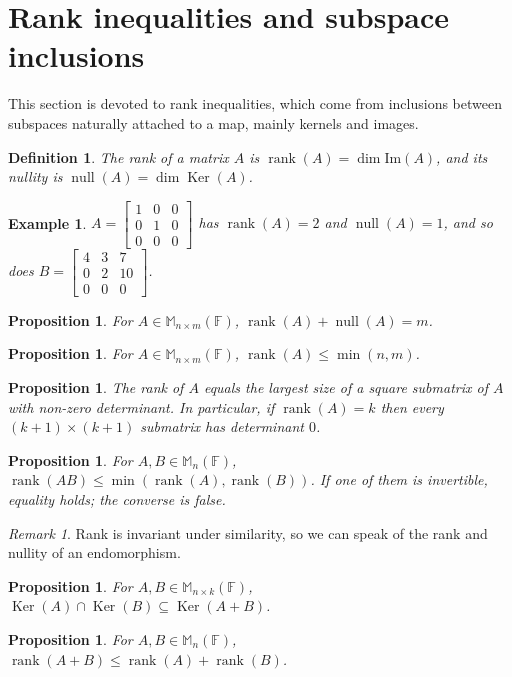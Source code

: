 \documentclass[12pt]{article}
\DeclareMathOperator{\Rank}{rank}
\DeclareMathOperator{\Null}{null}
\DeclareMathOperator{\Ker}{Ker}
\theoremstyle{breakplain}
\newtheorem{prop}[theorem]{Proposition}
\theoremstyle{breakdef}
\newtheorem{definition}[theorem]{Definition}
\newtheorem*{example}{Example}
\theoremstyle{remark}
\newtheorem*{remark}{Remark}
\begin{document}
\newpage
\section{Rank inequalities and subspace inclusions}
This section is devoted to rank inequalities, which come from inclusions between subspaces naturally attached to a map, mainly kernels and images.
\begin{definition}
    The \emph{rank} of a matrix $A$ is $\Rank(A)=\dim\mathrm{Im}(A)$, and its \emph{nullity} is $\Null(A)=\dim\Ker(A)$.
\end{definition}
\begin{example}
    $A=\begin{bmatrix}
        1 & 0 & 0\\0 & 1 & 0\\ 0& 0 & 0
    \end{bmatrix}$ has $\Rank(A)=2$ and $\Null(A)=1$, and so does $B=\begin{bmatrix}
        4 & 3 & 7\\0 & 2 & 10\\ 0& 0 & 0
    \end{bmatrix}$.
\end{example}
\begin{prop}
    For $A\in \mathbb{M}_{n\times m}(\mathbb{F})$, $\Rank(A)+\Null(A)=m$.
\end{prop}
\begin{prop}
    For $A\in \mathbb{M}_{n\times m}(\mathbb{F})$, $\Rank(A)\leq \min(n,m)$.
\end{prop}
\begin{prop}
    The rank of $A$ equals the largest size of a square submatrix of $A$ with non-zero determinant. In particular, if $\Rank(A)=k$ then every $(k+1)\times(k+1)$ submatrix has determinant $0$.
\end{prop}
\begin{prop}
    For $A,B\in\mathbb{M}_{n}(\mathbb{F})$, $\Rank(AB)\leq \min(\Rank(A),\Rank(B))$. If one of them is invertible, equality holds; the converse is false.
\end{prop}
\begin{remark}
    Rank is invariant under similarity, so we can speak of the rank and nullity of an endomorphism.
\end{remark}
\begin{prop}
    For $A,B \in\mathbb{M}_{n\times k}(\mathbb{F})$, $\Ker(A)\cap \Ker(B)\subseteq \Ker(A+B)$.
\end{prop}
\begin{prop}
    For $A,B\in\mathbb{M}_{n}(\mathbb{F})$, $\Rank(A+B)\leq \Rank(A)+\Rank(B)$.
\end{prop}
\end{document}
